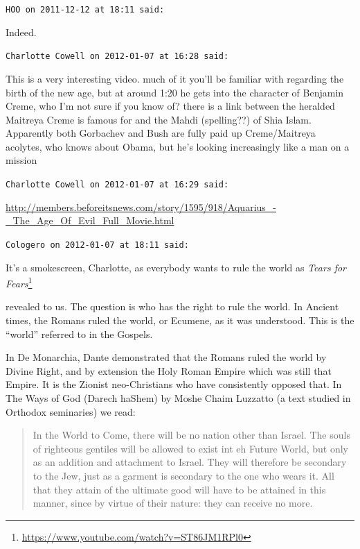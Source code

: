 \begin{footnotesize}
\begin{sffamily}
\texttt{HOO on 2011-12-12 at 18:11 said:}

Indeed.

\hfill

\texttt{Charlotte Cowell on 2012-01-07 at 16:28 said:}

This is a very interesting video. much of it you'll be familiar with regarding the birth of the new age, but at around 1:20 he gets into the character of Benjamin Creme, who I'm not sure if you know of? there is a link between the heralded Maitreya Creme is famous for and the Mahdi (spelling??) of Shia Islam. Apparently both Gorbachev and Bush are fully paid up Creme/Maitreya acolytes, who knows about Obama, but he's looking increasingly like a man on a mission

\hfill

\texttt{Charlotte Cowell on 2012-01-07 at 16:29 said:}

\url{http://members.beforeitsnews.com/story/1595/918/Aquarius\_-\_The\_Age\_Of\_Evil\_Full\_Movie.html}


\hfill

\texttt{Cologero on 2012-01-07 at 18:11 said:}

It's a smokescreen, Charlotte, as everybody wants to rule the world as
\textit{Tears for Fears}\footnote{\url{https://www.youtube.com/watch?v=ST86JM1RPl0}}

revealed to us. The question is who has the right to rule the world. In Ancient times, the Romans ruled the world, or Ecumene, as it was understood. This is the ``world'' referred to in the Gospels.

In De Monarchia, Dante demonstrated that the Romans ruled the world by Divine Right, and by extension the Holy Roman Empire which was still that Empire. It is the Zionist neo-Christians who have consistently opposed that. In The Ways of God (Darech haShem) by Moshe Chaim Luzzatto (a text studied in Orthodox seminaries) we read:

\begin{quote}

In the World to Come, there will be no nation other than Israel. The souls of righteous gentiles will be allowed to exist int eh Future World, but only as an addition and attachment to Israel. They will therefore be secondary to the Jew, just as a garment is secondary to the one who wears it. All that they attain of the ultimate good will have to be attained in this manner, since by virtue of their nature: they can receive no more.
\end{quote}



\end{sffamily}
\end{footnotesize}
